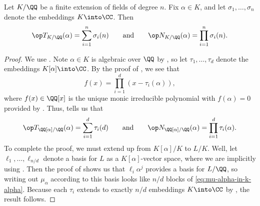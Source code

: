 \documentclass[../notes.tex]{subfiles}
\begin{document}
\begin{corollary}
	Let $K/\QQ$ be a finite extension of fields of degree $n$. Fix $\alpha\in K$, and let $\sigma_1,\ldots,\sigma_n$ denote the embeddings $K\into\CC$. Then
	\[\op T_{K/\QQ}(\alpha)=\sum_{i=1}^n\sigma_i(n)\qquad\text{and}\qquad\op N_{K/\QQ}(\alpha)=\prod_{i=1}^n\sigma_i(n).\]
\end{corollary}
\begin{proof}
	We use . Note $\alpha\in K$ is algebraic over $\QQ$ by , so let $\tau_1,\ldots,\tau_d$ denote the embeddings $K[\alpha]\into\CC$. By the proof of , we see that
	\[f(x)=\prod_{i=1}^d(x-\tau_i(\alpha)),\]
	where $f(x)\in\QQ[x]$ is the unique monic irreducible polynomial with $f(\alpha)=0$ provided by . Thus,  tells us that
	\[\op T_{\QQ[\alpha]/\QQ}(\alpha)=\sum_{i=1}^d\tau_i(d)\qquad\text{and}\qquad\op N_{\QQ[\alpha]/\QQ}(\alpha)=\prod_{i=1}^d\tau_i(\alpha).\]
	To complete the proof, we must extend up from $K[\alpha]/K$ to $L/K$. Well, let $\ell_1,\ldots,\ell_{n/d}$ denote a basis for $L$ as a $K[\alpha]$-vector space, where we are implicitly using . Then the proof of  shows us that $\ell_i\alpha^j$ provides a basis for $L/\QQ$, so writing out $\mu_\alpha$ according to this basis looks like $n/d$ blocks of \eqref{eq:mu-alpha-in-k-alpha}. Because each $\tau_i$ extends to exactly $n/d$ embeddings $K\into\CC$ by , the result follows.
\end{proof}
\end{document}
